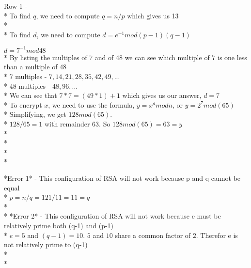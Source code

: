 \documentclass{article}
\begin{document}
\begin{solution}

Row 1 -
\\*
To find $q$, we need to compute $q = n/p$ which gives us 13
\\*\\*
To find $d$, we need to compute $d = e^{-1} mod (p-1)(q-1)$

\xxx$d = 7^{-1} mod 48$
\\*
\xxx By listing the multiples of $7$ and of $48$ we can see which multiple of $7$ is one less than a multiple of $48$
\\*
\xxx $7$ multiples - $7, 14, 21, 28, 35, 42, 49, ...$
\\*
\xxx $48$ multiples - $48, 96, ...$
\\*
\xxx We can see that $7*7 = (49 * 1) + 1$ which gives us our answer, $d=7$
\\*
\xxx To encrypt $x$, we need to use the formula, $y = x^{d} mod n$, or $y = 2^7 mod(65)$
\\*
\xxx Simplifying, we get $128 mod(65)$.
\\*
\xxx $128 / 65 = 1$ with remainder $63$. So $128 mod(65) = 63 = y$
\\*
\\* \\* \\*

*Error 1* - This configuration of RSA will not work because p and q cannot be equal
\\*
$p = n/q = 121/11 = 11 = q$
\\*\\*
*Error 2* - This configuration of RSA will not work because e must be relatively prime both (q-1) and (p-1)
\\*
$e = 5$ and $(q-1) = 10$. $5$ and $10$ share a common factor of $2$. Therefor e is not relatively prime to (q-1)
\\*\\*
                
           

\end{solution}



\newcommand{\vectwo}[2]{{\brackd{\begin{array}{c} #1 \\ #2 \end{array}}}}
\newcommand{\mattwo}[4]{{\brackd{\begin{array}{cc} #1 & #2 \\ #3 & #4\end{array}}}}
\end{document}
